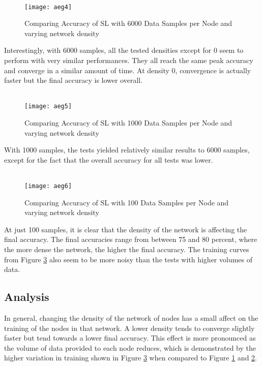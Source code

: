 \begin{figure}[H] 
	 \\
	\texttt{[image: aeg4]}
	\caption{Comparing Accuracy of SL with 6000 Data Samples per Node and varying network density}
	\label{aeg4}
\end{figure}

Interestingly, with 6000 samples, all the tested densities except for 0 seem to perform with very similar performances. They all reach the same peak accuracy and converge in a similar amount of time. At density 0, convergence is actually faster but the final accuracy is lower overall.

\begin{figure}[H]
	 \\
	\texttt{[image: aeg5]}
	\caption{Comparing Accuracy of SL with 1000 Data Samples per Node and varying network density}
	\label{aeg5}
\end{figure}

With 1000 samples, the tests yielded relatively similar results to 6000 samples, except for the fact that the overall accuracy for all tests was lower.

\begin{figure}[H]
	 \\
	\texttt{[image: aeg6]}
	\caption{Comparing Accuracy of SL with 100 Data Samples per Node and varying network density}
	\label{aeg6}
\end{figure}

At just 100 samples, it is clear that the density of the network is affecting the final accuracy. The final accuracies range from between 75 and 80 percent, where the more dense the network, the higher the final accuracy. The training curves from Figure \ref{aeg6} also seem to be more noisy than the tests with higher volumes of data.

\subsection{Analysis}
In general, changing the density of the network of nodes has a small affect on the training of the nodes in that network. A lower density tends to converge slightly faster but tend towards a lower final accuracy. This effect is more pronounced as the volume of data provided to each node reduces, which is demonstrated by the higher variation in training shown in Figure \ref{aeg6} when compared to Figure \ref{aeg4} and \ref{aeg5}.

